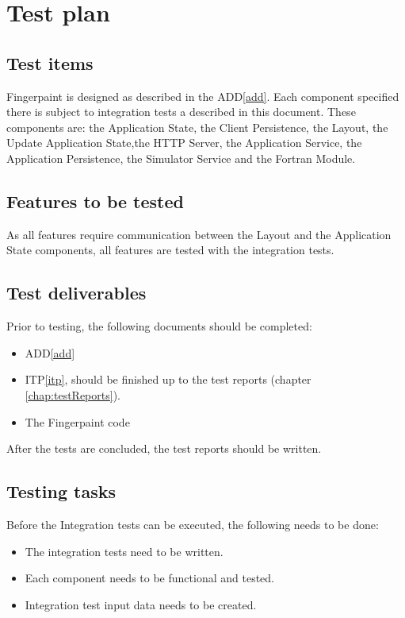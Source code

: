\chapter{Test plan}
\label{chap:testPlan}

\section{Test items}
Fingerpaint is designed as described in the ADD\ref{add}. Each component specified there is subject to integration tests a described in this document. These components are: the Application State, the Client Persistence, the Layout, the Update Application State,the HTTP Server, the Application Service, the Application Persistence, the Simulator Service and the Fortran Module.

\section{Features to be tested}
As all features require communication between the Layout and the Application State components, all features are tested with the integration tests.

\section{Test deliverables}
Prior to testing, the following documents should be completed:
\begin{itemize}
\item ADD\ref{add}
\item ITP\ref{itp}, should be finished up to the test reports (chapter \ref{chap:testReports}).
\item The Fingerpaint code
\end{itemize}
After the tests are concluded, the test reports should be written.

\section{Testing tasks}
Before the Integration tests can be executed, the following needs to be done:
\begin{itemize}
\item The integration tests need to be written.
\item Each component needs to be functional and tested.
\item Integration test input data needs to be created.
\end{itemize}

